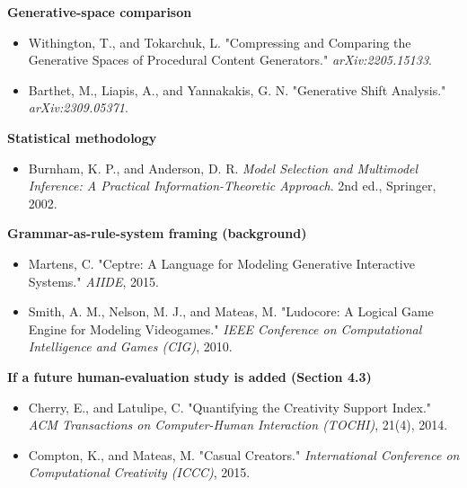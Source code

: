 \documentclass[
  10pt,
  twocolumn]{article}
\providecommand{\tightlist}{%
  \setlength{\itemsep}{0pt}\setlength{\parskip}{0pt}}
\begin{document}
\textbf{Generative-space comparison}

\begin{itemize}
\tightlist
\item
  Withington, T., and Tokarchuk, L. "Compressing and Comparing the
  Generative Spaces of Procedural Content Generators."
  \emph{arXiv:2205.15133}.
\item
  Barthet, M., Liapis, A., and Yannakakis, G. N. "Generative Shift
  Analysis." \emph{arXiv:2309.05371}.
\end{itemize}

\textbf{Statistical methodology}

\begin{itemize}
\tightlist
\item
  Burnham, K. P., and Anderson, D. R. \emph{Model Selection and
  Multimodel Inference: A Practical Information-Theoretic Approach}. 2nd
  ed., Springer, 2002.
\end{itemize}

\textbf{Grammar-as-rule-system framing (background)}

\begin{itemize}
\tightlist
\item
  Martens, C. "Ceptre: A Language for Modeling Generative Interactive
  Systems." \emph{AIIDE}, 2015.
\item
  Smith, A. M., Nelson, M. J., and Mateas, M. "Ludocore: A Logical Game
  Engine for Modeling Videogames." \emph{IEEE Conference on
  Computational Intelligence and Games (CIG)}, 2010.
\end{itemize}

\textbf{If a future human-evaluation study is added (Section 4.3)}

\begin{itemize}
\tightlist
\item
  Cherry, E., and Latulipe, C. "Quantifying the Creativity Support
  Index." \emph{ACM Transactions on Computer-Human Interaction (TOCHI)},
  21(4), 2014.
\item
  Compton, K., and Mateas, M. "Casual Creators." \emph{International
  Conference on Computational Creativity (ICCC)}, 2015.
\end{itemize}
\end{document}
